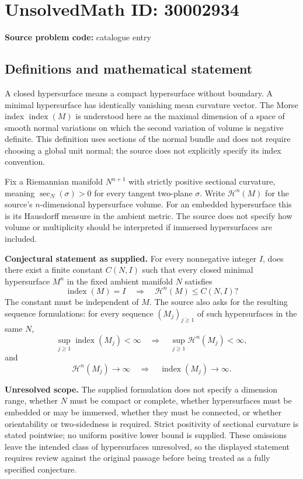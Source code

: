 \documentclass[11pt]{article}
\begin{document}
\section*{UnsolvedMath ID: 30002934}
\textbf{Source problem code:} catalogue entry
\subsection{Definitions and mathematical statement}
A closed hypersurface means a compact hypersurface without boundary. A minimal hypersurface has identically vanishing mean curvature vector. The Morse index \(\operatorname{index}(M)\) is understood here as the maximal dimension of a space of smooth normal variations on which the second variation of volume is negative definite. This definition uses sections of the normal bundle and does not require choosing a global unit normal; the source does not explicitly specify its index convention.

Fix a Riemannian manifold \(N^{n+1}\) with strictly positive sectional curvature, meaning \(\sec_N(\sigma)>0\) for every tangent two-plane \(\sigma\). Write \(\mathcal H^n(M)\) for the source's \(n\)-dimensional hypersurface volume. For an embedded hypersurface this is its Hausdorff measure in the ambient metric. The source does not specify how volume or multiplicity should be interpreted if immersed hypersurfaces are included.

\textbf{Conjectural statement as supplied.} For every nonnegative integer \(I\), does there exist a finite constant \(C(N,I)\) such that every closed minimal hypersurface \(M^n\) in the fixed ambient manifold \(N\) satisfies
\[
\operatorname{index}(M)=I
\quad\Longrightarrow\quad
\mathcal H^n(M)\leq C(N,I)?
\]
The constant must be independent of \(M\). The source also asks for the resulting sequence formulations: for every sequence \((M_j)_{j\geq1}\) of such hypersurfaces in the same \(N\),
\[
\sup_{j\geq1}\operatorname{index}(M_j)<\infty
\quad\Longrightarrow\quad
\sup_{j\geq1}\mathcal H^n(M_j)<\infty,
\]
and
\[
\mathcal H^n(M_j)\longrightarrow\infty
\quad\Longrightarrow\quad
\operatorname{index}(M_j)\longrightarrow\infty.
\]

\textbf{Unresolved scope.} The supplied formulation does not specify a dimension range, whether \(N\) must be compact or complete, whether hypersurfaces must be embedded or may be immersed, whether they must be connected, or whether orientability or two-sidedness is required. Strict positivity of sectional curvature is stated pointwise; no uniform positive lower bound is supplied. These omissions leave the intended class of hypersurfaces unresolved, so the displayed statement requires review against the original passage before being treated as a fully specified conjecture.
\end{document}
